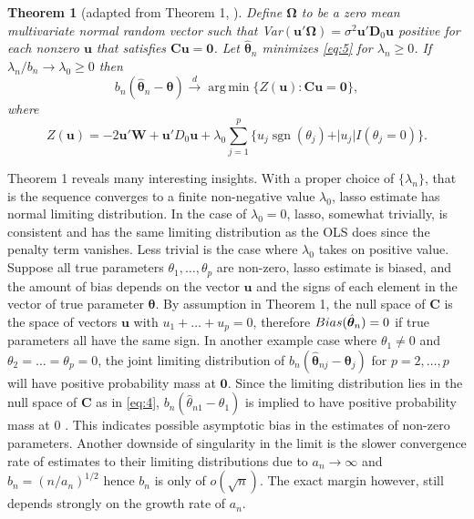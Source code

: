 \documentclass[12pt,a4paper]{article}
\DeclareMathOperator*{\argmin}{arg\,min} %
\DeclareMathOperator*{\sgn}{sgn} %
\newtheorem{theorem}{Theorem} %
\begin{document}
\begin{theorem} [adapted from Theorem 1, \cite{knight2008shrinkage}]
	Define $ \bm{\Omega} $ to be a zero mean multivariate normal random vector such that {\normalfont Var}$ (\bm{u}'\bm{\Omega}) = \sigma^2\bm{u}'\bm{D}_0\bm{u} $ positive for each nonzero $ \bm{u} $ that satisfies $ \bm{C}\bm{u} = \bm{0} $. Let $ \hat{\bm{\theta}}_n $ minimizes \eqref{eq:5} for $ \lambda_n \geq 0$. If $ \lambda_n/b_n \rightarrow \lambda_0 \geq 0 $ then
	\[
	b_n(\hat{\bm{\theta}}_n - \bm{\theta}) \overset{d}{\longrightarrow} 
	\argmin\{Z(\bm{u}):\bm{C}\bm{u} = \bm{0}\},
	\] where \[
	Z(\bm{u}) = -2\bm{u}'\bm{W} + \bm{u}'D_0\bm{u} +
	\lambda_0\sum_{j = 1}^p\{u_j\sgn(\theta_j) + \vert u_j\vert I(\theta_j = 0)\}.
	\]
\end{theorem}
Theorem 1 reveals many interesting insights. With a proper choice of $ \{\lambda_n\} $, that is the sequence converges to a finite non-negative value $ \lambda_0 $, lasso estimate has normal limiting distribution. In the case of $ \lambda_0 = 0 $, lasso, somewhat trivially, is consistent and has the same limiting distribution as the OLS does since the penalty term vanishes. Less trivial is the case where $ \lambda_0 $ takes on positive value. Suppose all true parameters $ \theta_1, \ldots, \theta_p $ are non-zero, lasso estimate is biased, and the amount of bias depends on the vector $ \bm{u} $ and the signs of each element in the vector of true parameter $ \bm{\theta} $. By assumption in Theorem 1, the null space of $ \bm{C} $ is the space of vectors $ \bm{u} $ with $ u_1 + \ldots + u_p = 0 $, therefore $ {\normalfont Bias}(\hat{\bm{\theta}}_n) = 0 $ if true parameters all have the same sign. In another example case where $ \theta_1 \neq 0 $ and $ \theta_2 = \ldots = \theta_p = 0 $, the joint limiting distribution of $ b_n(\hat{\bm{\theta}}_{nj} - \bm{\theta}_j) $ for $ p = 2, \ldots, p $ will have positive probability mass at $ \bm{0} $. Since the limiting distribution lies in the null space of $ \bm{C} $ as in \eqref{eq:4}, $ b_n(\hat{\theta}_{n1} - \theta_1) $ is implied to have positive probability mass at 0 \citep{knight2008shrinkage}. This indicates possible asymptotic bias in the estimates of non-zero parameters. Another downside of singularity in the limit is the slower convergence rate of estimates to their limiting distributions due to $ a_n \rightarrow \infty $ and $ b_n = (n/a_n)^{1/2} $ hence $ b_n $ is only of $ o(\sqrt{n}) $. The exact margin however, still depends strongly on the growth rate of $ a_n $. 
\end{document}
